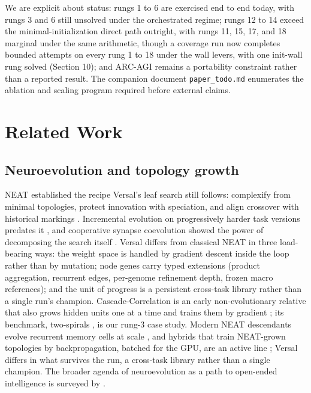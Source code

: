 \documentclass[11pt]{article}
\begin{document}
We are explicit about status: rungs 1 to 6 are exercised end to end today, with rungs 3 and 6 still unsolved under the orchestrated regime; rungs 12 to 14 exceed the minimal-initialization direct path outright, with rungs 11, 15, 17, and 18 marginal under the same arithmetic, though a coverage run now completes bounded attempts on every rung 1 to 18 under the wall levers, with one init-wall rung solved (Section 10); and ARC-AGI remains a portability constraint rather than a reported result. The companion document \texttt{paper_todo.md} enumerates the ablation and scaling program required before external claims.

\section{Related Work}

\subsection{Neuroevolution and topology growth}

NEAT established the recipe Versal's leaf search still follows: complexify from minimal topologies, protect innovation with speciation, and align crossover with historical markings \citep{stanley2002}. Incremental evolution on progressively harder task versions predates it \citep{gomez1997}, and cooperative synapse coevolution showed the power of decomposing the search itself \citep{gomez2008}. Versal differs from classical NEAT in three load-bearing ways: the weight space is handled by gradient descent inside the loop rather than by mutation; node genes carry typed extensions (product aggregation, recurrent edges, per-genome refinement depth, frozen macro references); and the unit of progress is a persistent cross-task library rather than a single run's champion. Cascade-Correlation is an early non-evolutionary relative that also grows hidden units one at a time and trains them by gradient \citep{fahlman1990}; its benchmark, two-spirals \citep{lang1988}, is our rung-3 case study. Modern NEAT descendants evolve recurrent memory cells at scale \citep{ororbia2019}, and hybrids that train NEAT-grown topologies by backpropagation, batched for the GPU, are an active line \citep{merry2024}; Versal differs in what survives the run, a cross-task library rather than a single champion. The broader agenda of neuroevolution as a path to open-ended intelligence is surveyed by \citet{stanley2019}.
\end{document}
